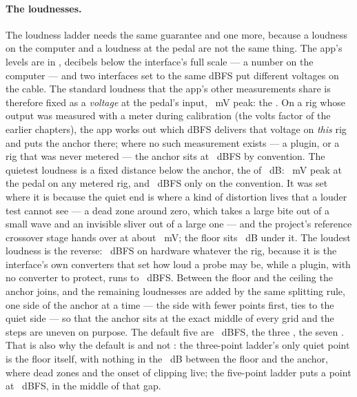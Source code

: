 \documentclass[11pt,a4paper]{article}
\begin{document}
\paragraph{The loudnesses.} The loudness ladder needs the same guarantee
and one more, because a loudness on the computer and a loudness at the
pedal are not the same thing. The app's levels are in ,
decibels below the interface's full scale --- a number on the computer
--- and two interfaces set to the same dBFS put different voltages on the
cable. The standard loudness that the app's other measurements share is
therefore fixed as a \emph{voltage} at the pedal's input,
\wmAnchorMillivolts{}~mV peak: the . On a rig whose
output was measured with a meter during calibration (the volts factor of
the earlier chapters), the app works out which dBFS delivers that voltage
on \emph{this} rig and puts the anchor there; where no such measurement
exists --- a plugin, or a rig that was never metered --- the anchor sits
at \wmNoVoltsAnchorDBFS{}~dBFS by convention. The quietest loudness is a
fixed distance below the anchor, the  of
\wmFloorSpanDB{}~dB: \wmFloorMillivolts{}~mV peak at the pedal on any
metered rig, and \wmDefaultFloorDBFS{}~dBFS only on the convention. It
was set where it is because the quiet end is where a kind of distortion
lives that a louder test cannot see --- a dead zone around zero, which
takes a large bite out of a small wave and an invisible sliver out of a
large one --- and the project's reference crossover stage hands over at
about \wmHandoverMillivolts{}~mV; the floor sits
\wmFloorBelowHandoverDB{}~dB under it. The loudest loudness is the
reverse: \wmCeilingDBFS{}~dBFS on hardware whatever the rig, because it
is the interface's own converters that set how loud a probe may be, while
a plugin, with no converter to protect, runs to
\wmPluginCeilingDBFS{}~dBFS. Between the floor and the ceiling the anchor
joins, and the remaining loudnesses are added by the same splitting rule,
one side of the anchor at a time --- the side with fewer points first,
ties to the quiet side --- so that the anchor sits at the exact middle of
every grid and the steps are uneven on purpose. The default five are
\mlatDefaultFive{}~dBFS, the three \mlatDefaultThree{}, the seven
\mlatDefaultSeven{}. That is also why the default is
\wmDefaultDimension{} and not \wmSmallestDimension{}: the three-point
ladder's only quiet point is the floor itself, with nothing in the
\wmFloorSpanDB{}~dB between the floor and the anchor, where dead zones
and the onset of clipping live; the five-point ladder puts a point at
\wmFiveGapLevelDBFS{}~dBFS, in the middle of that gap.
\end{document}

